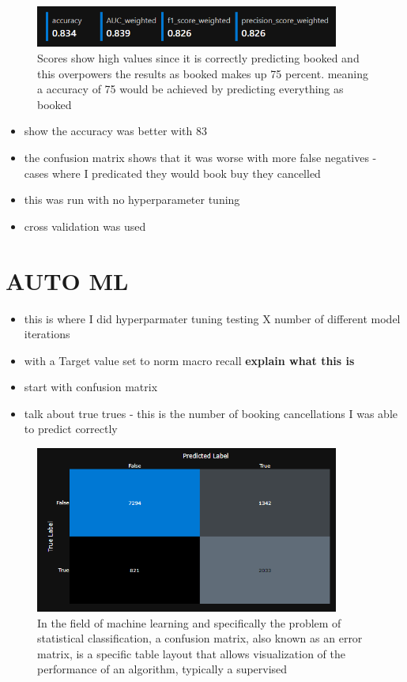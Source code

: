 \begin{figure}[hbt!]
 \includegraphics[width=10cm]{figures/xg_boost_scores.png}
 \caption{Scores show high values since it is correctly predicting booked and this overpowers the results as booked makes up 75 percent. meaning a accuracy of 75 would be achieved by predicting everything as booked }
\end{figure}

\begin{itemize}
\item show the accuracy was better with 83
\item the confusion matrix shows that it was worse with more false negatives - cases where I predicated they would book buy they cancelled
\item this was run with no hyperparameter tuning
\item cross validation was used
\end{itemize}



\section{AUTO ML}

\begin{itemize}
\item this is where I did hyperparmater tuning testing X number of different model iterations 
\item with a Target value set to norm macro recall \textbf{explain what this is}
\end{itemize}



\begin{itemize}
\item start with confusion matrix
\item talk about true trues - this is the number of booking cancellations I was able to predict correctly 
\end{itemize}

\begin{figure}[hbt!]
 \includegraphics[width=10cm]{figures/azure_ml_confusion_matrix.png}
 \caption{In the field of machine learning and specifically the problem of statistical classification, a confusion matrix, also known as an error matrix, is a specific table layout that allows visualization of the performance of an algorithm, typically a supervised}
\end{figure}

